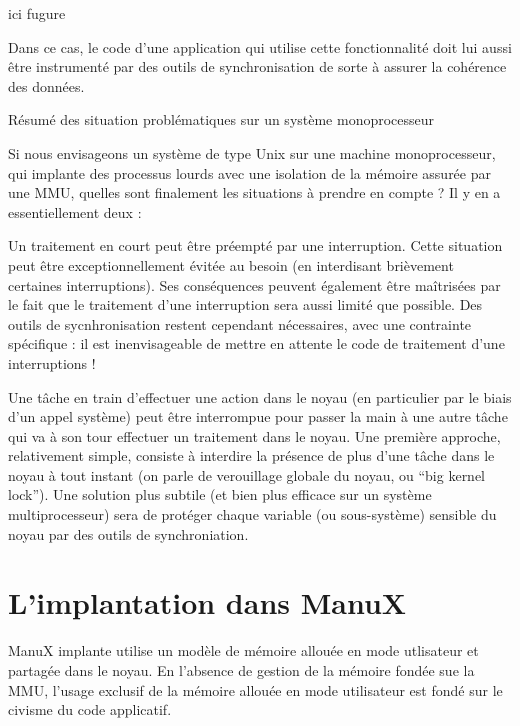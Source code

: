 ici fugure

   Dans ce cas, le code d'une application qui utilise cette
fonctionnalité doit lui aussi être instrumenté par des outils de
synchronisation de sorte à assurer la cohérence des données.

Résumé des situation problématiques sur un système monoprocesseur

   Si nous envisageons un système de type Unix sur une machine
monoprocesseur, qui implante des processus lourds avec une isolation
de la mémoire assurée par une MMU, quelles sont finalement les
situations à prendre en compte ? Il y en a essentiellement deux :

   Un traitement en court peut être préempté par une
   interruption. Cette situation peut être exceptionnellement évitée
   au besoin (en interdisant brièvement certaines interruptions). Ses
   conséquences peuvent également être maîtrisées par le fait que le
   traitement d'une interruption sera aussi limité que possible. Des
   outils de sycnhronisation restent cependant nécessaires, avec une
   contrainte spécifique : il est inenvisageable de mettre en attente
   le code de traitement d'une interruptions !

   Une tâche en train d'effectuer une action dans le noyau (en
   particulier par le biais d'un appel système) peut être interrompue
   pour passer la main à une autre tâche qui va à son tour effectuer
   un traitement dans le noyau. Une première approche, relativement
   simple, consiste à interdire la présence de plus d'une tâche dans
   le noyau à tout instant (on parle de verouillage globale du noyau,
   ou ``big kernel lock''). Une solution plus subtile (et bien plus
   efficace sur un système multiprocesseur) sera de protéger chaque
   variable (ou sous-système) sensible du noyau par des outils de
   synchroniation. 

\section{L'implantation dans ManuX}

   ManuX implante utilise un modèle de mémoire allouée en mode
utlisateur et partagée dans le noyau. En l'absence de gestion de la
mémoire fondée sue la MMU, l'usage exclusif de la mémoire allouée en
mode utilisateur est fondé sur le civisme du code applicatif.

